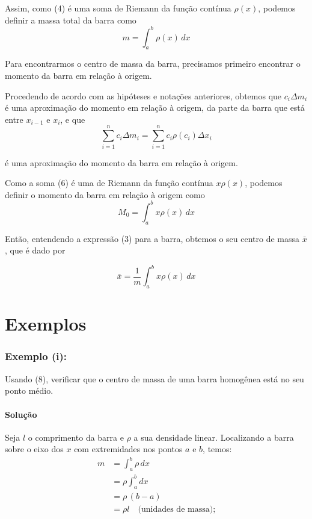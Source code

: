 \documentclass[12pt,a4paper]{report}
\begin{document}
Assim, como (4) é uma soma de Riemann da função contínua $\rho(x)$, podemos definir a massa total da barra como
\begin{equation}
    m = \int_{a}^{b} \rho(x) \, dx 
\end{equation}

Para encontrarmos o centro de massa da barra, precisamos primeiro encontrar o momento da barra em relação à origem.

Procedendo de acordo com as hipóteses e notações anteriores, obtemos que $c_i \Delta m_i$ é uma aproximação do momento em relação à origem, da parte da barra que está entre $x_{i-1}$ e $x_i$, e que
\begin{equation}
    \sum_{i = 1}^{n} c_i \Delta m_i = \sum_{i = 1}^{n} c_i \rho(c_i) \Delta x_i
\end{equation}

é uma aproximação do momento da barra em relação à origem.

Como a soma (6) é uma de Riemann da função contínua $x \rho(x)$, podemos definir o momento da barra em relação à origem como
\begin{equation}
    M_0 = \int_{a}^{b} x \rho(x) \, dx
\end{equation}

Então, entendendo a expressão (3) para a barra, obtemos o seu centro de massa $\bar{x}$, que é dado por
\endgroup

\begin{equation}
    \bar{x} = \frac{1}{m} \int_{a}^{b} x \rho(x) \, dx \tag{8}
\end{equation}

\chapter*{Exemplos}

\subsection*{Exemplo (i):}
Usando (8), verificar que o centro de massa de uma barra homogênea está no seu ponto médio.


\subsubsection*{Solução} 
Seja $l$ o comprimento da barra e $\rho$ a sua densidade linear. Localizando a barra sobre o eixo dos $x$ com extremidades nos pontos $a$ e $b$, temos:
\begin{align*}
    m &= \int_{a}^{b} \rho \, dx \\
      &= \rho \int_a^b dx \\
      &= \rho \, (b - a) \\
      &= \rho l \quad \text{(unidades de massa);}
\end{align*}
\end{document}
